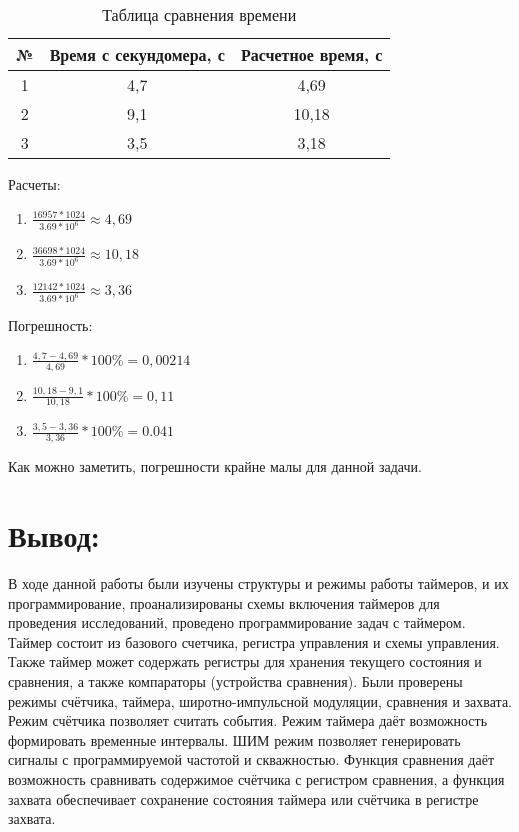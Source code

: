 \documentclass{bmstu}
\begin{document}
\begin{table}
\label{table:eq_table_2}
\caption{Таблица сравнения времени}
\begin{tabular} {|c|c|c|}
	\hline
		№ &Время с секундомера, с & Расчетное время, с \\
	\hline
		1 & 4,7 & 4,69 \\
	\hline
		2 & 9,1 & 10,18 \\
	\hline
		3 & 3,5 & 3,18 \\
	\hline	
\end{tabular}
\end{table}


Расчеты: 
\begin{enumerate} [label=\arabic*)]
\item $\frac{16957*1024}{3.69*10^6} \approx 4,69$ 
\item $\frac{36698*1024}{3.69*10^6} \approx 10,18$ 
\item $\frac{12142*1024}{3.69*10^6} \approx 3,36$
\end{enumerate}
Погрешность: 
\begin{enumerate}[label=\arabic*)] 
\item $\frac{4,7-4,69}{4,69} * 100\% = 0,002 14$ 
\item $\frac{10,18-9,1}{10,18} * 100\% = 0,11 $
\item $\frac{3,5-3,36}{3,36} * 100\% = 0.041 $
\end{enumerate}

Как можно заметить, погрешности крайне малы для данной задачи.
\newline


\chapter{Вывод:}
В ходе данной работы были изучены структуры и режимы работы таймеров, и их программирование, проанализированы 
схемы включения таймеров для проведения исследований, проведено программирование задач с таймером. Таймер состоит 
из базового счетчика, регистра управления и схемы управления. Также таймер может содержать регистры для хранения 
текущего состояния и сравнения, а также компараторы (устройства сравнения). Были проверены режимы счётчика, 
таймера, широтно-импульсной модуляции, сравнения и захвата. Режим счётчика позволяет считать события. Режим 
таймера даёт возможность формировать временные интервалы. ШИМ режим позволяет генерировать сигналы с 
программируемой частотой и скважностью. Функция сравнения даёт возможность сравнивать содержимое счётчика с 
регистром сравнения, а функция захвата обеспечивает сохранение состояния таймера или счётчика в регистре захвата.
\end{document}

